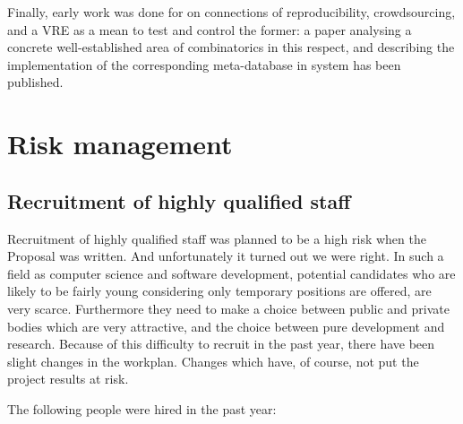 \documentclass{deliverablereport}
\begin{document}
Finally, early work was done for
 on connections of
reproducibility, crowdsourcing, and a VRE as a mean to test and
control the former: a paper \cite{2016arXiv160100181C} analysing a
concrete well-established area of combinatorics in this respect, and
describing the implementation of the corresponding meta-database in
\Sage system has been published.

\section{Risk management}
\subsection{Recruitment of highly qualified staff}
 Recruitment of highly qualified staff was planned to be a high risk when the Proposal was written. And unfortunately it turned out we were right. In such a field as computer science and software development, potential candidates who are likely to be fairly young considering only temporary positions are offered, are very scarce. Furthermore they need to make a choice between public and private bodies which are very attractive, and the choice between pure development and research.
Because of this difficulty to recruit in the past year, there have been slight changes in the workplan. Changes which have, of course, not put the project results at risk.

The following people were hired in the past year:\\
\end{document}
